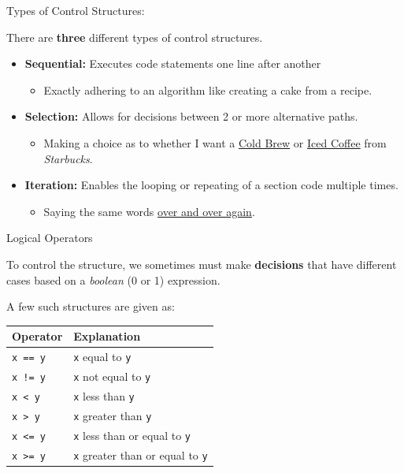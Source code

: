 \begin{frame}{Types of Control Structures:}

There are \textbf{three} different types of control structures.

\begin{itemize}
\tightlist
\item
  \textbf{Sequential:} Executes code statements one line after another

  \begin{itemize}
  \tightlist
  \item
    Exactly adhering to an algorithm like creating a cake from a recipe.
  \end{itemize}
\item
  \textbf{Selection:} Allows for decisions between 2 or more alternative
  paths.

  \begin{itemize}
  \tightlist
  \item
    Making a choice as to whether I want a
    \href{http://lp.starbucks.com/coldbrew}{Cold Brew} or
    \href{http://www.starbucks.com/menu/drinks/iced-coffee/iced-coffee}{Iced
    Coffee} from \emph{Starbucks}.
  \end{itemize}
\item
  \textbf{Iteration:} Enables the looping or repeating of a section code
  multiple times.

  \begin{itemize}
  \tightlist
  \item
    Saying the same words
    \href{https://www.youtube.com/watch?v=NP0mQeLWCCo}{over and over
    again}.
  \end{itemize}
\end{itemize}

\end{frame}

\begin{frame}[fragile]{Logical Operators}

To control the structure, we sometimes must make \textbf{decisions} that
have different cases based on a \emph{boolean} (0 or 1) expression.

A few such structures are given as:

\begin{longtable}[c]{@{}ll@{}}
\toprule
Operator & Explanation\tabularnewline
\midrule
\endhead
\texttt{x\ ==\ y} & \texttt{x} equal to \texttt{y}\tabularnewline
\texttt{x\ !=\ y} & \texttt{x} not equal to \texttt{y}\tabularnewline
\texttt{x\ \textless{}\ y} & \texttt{x} less than
\texttt{y}\tabularnewline
\texttt{x\ \textgreater{}\ y} & \texttt{x} greater than
\texttt{y}\tabularnewline
\texttt{x\ \textless{}=\ y} & \texttt{x} less than or equal to
\texttt{y}\tabularnewline
\texttt{x\ \textgreater{}=\ y} & \texttt{x} greater than or equal to
\texttt{y}\tabularnewline
\bottomrule
\end{longtable}

\end{frame}

